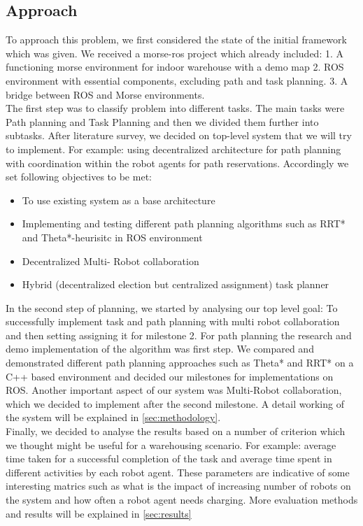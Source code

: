\documentclass[journal]{IEEEtran}
\begin{document}
\subsection{Approach}
To approach this problem, we first considered the state of the initial framework which was given. We received a morse-ros project which already included: 
1. A functioning morse environment for indoor warehouse with a demo map 2. ROS environment with essential components, excluding path and task planning. 3. A bridge between ROS and Morse environments.  
\\
The first step was to classify problem into different tasks. The main tasks were Path planning and Task Planning and then we divided them further into subtasks. After literature survey, we decided on top-level system that we will try to implement. For example: using decentralized architecture for path planning with coordination within the robot agents for path reservations. Accordingly we set following objectives to be met:
\begin{itemize}
\item To use existing system as a base architecture  
\item Implementing and testing different path planning algorithms such as RRT* and Theta*-heurisitc in ROS environment
\item Decentralized Multi- Robot collaboration
\item Hybrid (decentralized election but centralized assignment) task planner 
\end{itemize}
In the second step of planning, we started by analysing our top level goal: To successfully implement task and path planning with multi robot collaboration and then setting assigning it for milestone 2. For path planning the research and demo implementation of the algorithm was first step. We compared and demonstrated different path planning approaches such as Theta* and RRT* on a C++ based environment and decided our milestones for implementations on ROS. Another important aspect of our system was Multi-Robot collaboration, which we decided to implement after the second milestone.  A detail working of the system will be explained in \ref{sec:methodology}.
\\
Finally, we decided to analyse the results based on a number of criterion which we thought might be useful for a warehousing scenario. For example: average time taken for a successful completion of the task and average time spent in different activities by each robot agent. These parameters are indicative of some interesting matrics such as what is the impact of increasing number of robots on the system and how often a robot agent needs charging. More evaluation methods and results will be explained in \ref{sec:results} 
\end{document}
